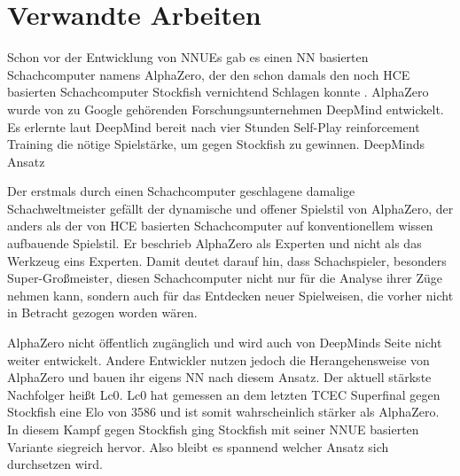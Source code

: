 \chapter{Verwandte Arbeiten}

Schon vor der Entwicklung von \acp{NNUE} gab es einen \ac{NN} basierten Schachcomputer namens AlphaZero, der den schon damals den noch \ac{HCE} basierten Schachcomputer Stockfish vernichtend Schlagen konnte \cite{Silver2017}. AlphaZero wurde \citeyear{Silver2017} von zu Google gehörenden Forschungsunternehmen DeepMind entwickelt. Es erlernte laut DeepMind bereit nach vier Stunden Self-Play reinforcement Training die nötige Spielstärke, um gegen Stockfish zu gewinnen. DeepMinds Ansatz 

Der erstmals durch einen Schachcomputer geschlagene damalige Schachweltmeister \citeauthor{Kasparov2018} \cite{Kasparov2018} gefällt der dynamische und offener Spielstil von AlphaZero, der anders als der von \ac{HCE} basierten Schachcomputer auf konventionellem wissen aufbauende Spielstil. Er beschrieb AlphaZero als Experten und nicht als das Werkzeug eins Experten. Damit deutet \citeauthor{Kasparov2018} darauf hin, dass Schachspieler, besonders Super-Großmeister, diesen Schachcomputer nicht nur für die Analyse ihrer Züge nehmen kann, sondern auch für das Entdecken neuer Spielweisen, die vorher nicht in Betracht gezogen worden wären.

AlphaZero nicht öffentlich zugänglich und wird auch von DeepMinds Seite nicht weiter entwickelt. Andere Entwickler nutzen jedoch die Herangehensweise von AlphaZero und bauen ihr eigens \ac{NN} nach diesem Ansatz. Der aktuell stärkste Nachfolger heißt \ac{Lc0}. \ac{Lc0} hat gemessen an dem letzten \ac{TCEC} Superfinal gegen Stockfish eine Elo von 3586 \cite{haworth202120th} und ist somit wahrscheinlich stärker als AlphaZero. In diesem Kampf gegen Stockfish ging Stockfish mit seiner \ac{NNUE} basierten Variante siegreich hervor. Also bleibt es spannend welcher Ansatz sich durchsetzen wird.